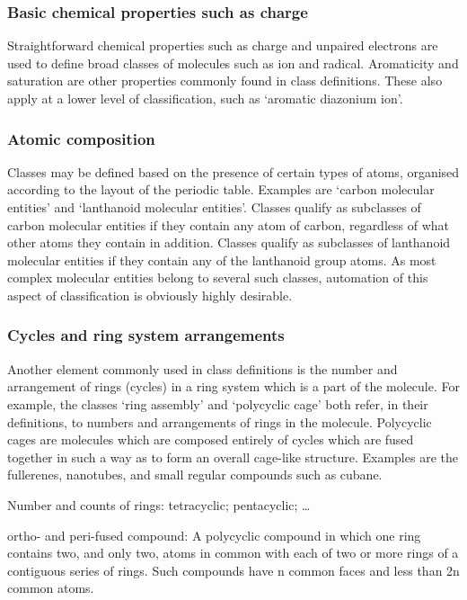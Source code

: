 \documentclass[10pt]{bmc_article}
\newenvironment{bmcformat}{\baselineskip20pt\sloppy\setboolean{publ}{false}}{\baselineskip20pt\sloppy}
\begin{document}
\begin{bmcformat}
\subsubsection*{Basic chemical properties such as charge}

Straightforward chemical properties such as charge and unpaired electrons are used to define broad classes of molecules such as ion and radical. Aromaticity and saturation are other properties commonly found in class definitions. These also apply at a lower level of classification, such as `aromatic diazonium ion'.  


\subsubsection*{Atomic composition}

Classes may be defined based on the presence of certain types of atoms, organised according to the layout of the periodic table.  Examples are `carbon molecular entities' and `lanthanoid molecular entities'. Classes qualify as subclasses of carbon molecular entities if they contain any atom of carbon, regardless of what other atoms they contain in addition.  Classes qualify as subclasses of lanthanoid molecular entities if they contain any of the lanthanoid group atoms.  As most complex molecular entities belong to several such classes, automation of this aspect of classification is obviously highly desirable. 


\subsubsection*{Cycles and ring system arrangements}

Another element commonly used in class definitions is the number and arrangement of rings (cycles) in a ring system which is a part of the molecule. For example, the classes `ring assembly' and `polycyclic cage' both refer, in their definitions, to numbers and arrangements of rings in the molecule. Polycyclic cages are molecules which are composed entirely of cycles which are fused together in such a way as to form an overall cage-like structure.  Examples are the fullerenes, nanotubes, and small regular compounds such as cubane. 

Number and counts of rings: tetracyclic; pentacyclic; \ldots

ortho- and peri-fused compound: A polycyclic compound in which one ring contains two, and only two, atoms in common with each of two or more rings of a contiguous series of rings. Such compounds have n common faces and less than 2n common atoms.


\end{bmcformat}
\end{document}
